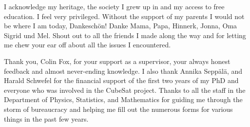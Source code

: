 I acknowledge my heritage, the society I grew up in and my access to free education.
I feel very privileged. 
Without the support of my parents I would not be where I am
today, Dankesch{\"o}n! 
Danke Mama, Papa, Hinnerk, Jonna, Oma Sigrid und Mel. 
Shout out to all the friends I made along the way and for letting me chew your ear off about
all the issues I encountered.

Thank you, Colin Fox, for your support as a supervisor, your always honest feedback and almost never-ending knowledge. 
I also thank Annika Sepp{\"a}l{\"a}, and Harald Schwefel for the financial support of the first two years of my PhD and everyone who was involved in the CubeSat project.
Thanks to all the staff in the Department of Physics, Statistics, and Mathematics for guiding me through the storm of bureaucracy and helping me fill out the numerous forms for various things in the past few years.
%
%
%
%
%
